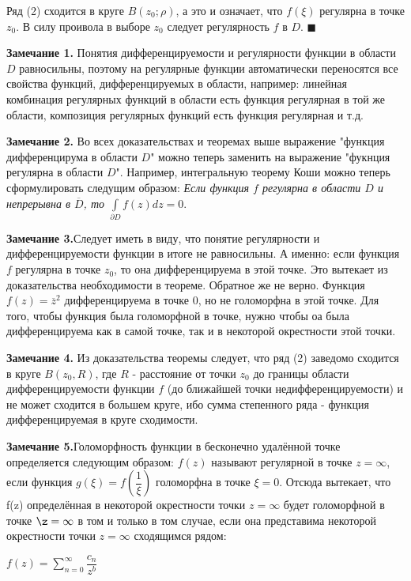 \documentclass[a4paper, 12pt]{report}
\begin{document}
Ряд (2) сходится в круге $B(z_0; \rho)$, а это и означает, что $f(\xi)$ регулярна в точке $z_0$. В силу проивола в выборе $z_0$ следует регулярность $f$ в $D$. \quad $\blacksquare$
\par\bigskip
\textbf{Замечание 1.} \quad Понятия дифференцируемости и регулярности функции в области $D$ равносильны, поэтому на регулярные функции автоматически переносятся все свойства функций, дифференцируемых в области, например: линейная комбинация регулярных функций в области есть функция регулярная в той же области, композиция регулярных функций есть функция регулярная и т.д.
\par\bigskip
\textbf{Замечание 2.} \quad Во всех доказательствах и теоремах выше выражение "функция дифференцирума в области $D$" можно теперь заменить на выражение "фукнция регулярна в области $D$". Например, интегральную теорему Коши можно теперь сформулировать следущим образом: \textit{Если функция $f$ регулярна в области $D$ и непрерывна в $\overline{D}$, то $\int\limits_{\partial D}f(z)dz = 0$}.
\par\bigskip
\textbf{Замечание 3.}\quad Следует иметь в виду, что понятие регулярности и дифференцируемости функции в итоге не равносильны. А именно: если функция $f$ регулярна в точке $z_0$, то она дифференцируема в этой точке. Это вытекает из доказательства необходимости в теореме. Обратное же не верно. Функция $f(z) = \overline{z}^2$ дифференцируема в точке 0, но не голоморфна в этой точке. Для того, чтобы функция была голоморфной в точке, нужно чтобы оа была дифференцируема как в самой точке, так и в некоторой окрестности этой точки.
\par\bigskip
\textbf{Замечание 4.} \quad Из доказательства теоремы следует, что ряд (2) заведомо сходится в круге $B(z_0, R)$, где $R$ - расстояние от точки $z_0$ до границы области дифференцируемости функции $f$ (до ближайшей точки недифференцируемости) и не может сходится в большем круге, ибо сумма степенного ряда - функция дифференцируемая в круге сходимости.
\par\bigskip
\textbf{Замечание 5.}\quad Голоморфность функции в бесконечно удалённой точке определяется следующим образом: $f(z)$ называют регулярной в точке $z = \infty$, если функция $g(\xi) = f(\dfrac{1}{\xi})$ голоморфна в точке $\xi = 0$. Отсюда вытекает, что f(z) определённая в некоторой окрестности точки $z = \infty$ будет голоморфной в точке $\z = \infty$ в том и только в том случае, если она представима некоторой окрестности точки $z = \infty$ сходящимся рядом:

\begin{center}
    $f(z) = \sum\limits_{n=0}^{\infty}\dfrac{c_n}{z^b}$
\end{center}
\end{document}
